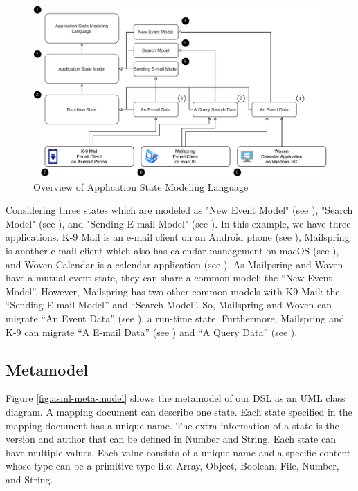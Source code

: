 \begin{figure}
    \includegraphics[scale=0.75]{../figures/asml-overview}
    \centering
    \caption{Overview of Application State Modeling Language}
    \label{fig:asml-overview}
\end{figure}
Considering three states which are modeled as "New Event Model" (see \fcircfour), "Search Model" (see \fcircfive), and "Sending E-mail Model" (see \fcircsix). In this example, we have three applications. K-9 Mail is an e-mail client on an Android phone (see \fcircseven), Mailspring is another e-mail client which also has calendar management on macOS (see \fcirceight), and Woven Calendar is a calendar application (see \fcircnine). As Mailpsring and Waven have a mutual event state, they can share a common model: the “New Event Model”. However, Mailspring has two other common models with K9 Mail: the “Sending E-mail Model” and “Search Model”. So, Mailspring and Woven can migrate “An Event Data” (see \circone), a run-time state. Furthermore, Mailspring and K-9 can migrate “A E-mail Data” (see \circtwo) and “A Query Data” (see \circthree).

\subsection{Metamodel}
Figure \ref{fig:asml-meta-model} shows the metamodel of our DSL as an UML class diagram. A mapping document can describe one state. Each state specified in the mapping document has a unique name. The extra information of a state is the version and author that can be defined in Number and String. Each state can have multiple values. Each value consists of a unique name and a specific content whose type can be a primitive type like Array, Object, Boolean, File, Number, and String. 

